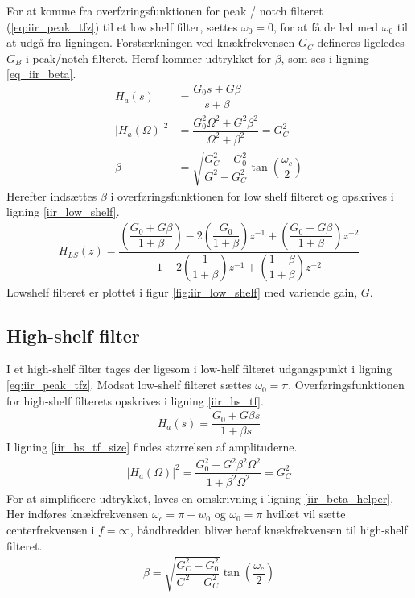 	For at komme fra overføringsfunktionen for peak / notch filteret (\ref{eq:iir_peak_tfz}) til et low shelf filter, sættes $\omega_0 = 0$, for at få de led med $\omega_0$ til at udgå fra ligningen. 
	Forstærkningen ved knækfrekvensen $G_C$ defineres ligeledes $G_B$ i peak/notch filteret.
    Heraf kommer udtrykket for $\beta$, som ses i ligning \ref{eq_iir_beta}.
    \begin{align}
        H_a (s) &= \dfrac{G_0 s + G \beta}{s + \beta} \nonumber \\
        |H_a (\Omega)|^2 &= \dfrac{G_0^2 \Omega^2 + G^2 \beta^2}{\Omega^2 + \beta^2} = G_C^2 \nonumber \\
        \beta &= \sqrt{\dfrac{G_C^2 - G_0^2}{G^2 - G_C^2}} \tan \left( \dfrac{\omega_c}{2} \right) \label{eq_iir_beta}
    \end{align}
	Herefter indsættes $\beta$ i overføringsfunktionen for low shelf filteret og opskrives i ligning \ref{iir_low_shelf}.
     \begin{align}
      H_{LS}(z) =  \dfrac{\left(\dfrac{G_0 + G \beta}{1 + \beta} \right)- 2 \left(\dfrac{G_0 }{1 +\beta} \right)z^{-1} + \left(\dfrac{ G_0 - G \beta}{1 + \beta }\right) z^{-2}}{1 - 2 \left(\dfrac{1}{1 + \beta}\right)z^{-1} + \left( \dfrac{1 - \beta}{1 + \beta} \right) z^{-2}} \label{iir_low_shelf}
     \end{align}
	Lowshelf filteret er plottet i figur \ref{fig:iir_low_shelf} med variende gain, $G$.
   
   
     \subsection{High-shelf filter}
	I et high-shelf filter tages der ligesom i low-helf filteret udgangspunkt i ligning \ref{eq:iir_peak_tfz}. Modsat low-shelf filteret sættes $\omega_0 = \pi$.
	Overføringsfunktionen for high-shelf filterets opskrives i ligning \ref{iir_hs_tf}.
     \begin{align}
        H_a (s) = \dfrac{G_0 + G \beta s}{1 + \beta s} \label{iir_hs_tf}
     \end{align}
	I ligning \ref{iir_hs_tf_size} findes størrelsen af amplituderne.
     \begin{align}
         |H_a(\Omega)|^2 = \dfrac{G_0^2 + G^2 \beta^2 \Omega^2}{1 + \beta^2 \Omega^2} = G_C^2 \label{iir_hs_tf_size}
     \end{align}
     For at simplificere udtrykket, laves en omskrivning i ligning \ref{iir_beta_helper}. Her indføres knækfrekvensen $\omega_c = \pi - w_0$ og $\omega_0 = \pi$ hvilket vil sætte centerfrekvensen i $f = \infty$, båndbredden bliver heraf knækfrekvensen til high-shelf filteret.
    \begin{align}
        \beta = \sqrt{\dfrac{G_C^2 - G_0^2}{G^2 - G_C^2}} \tan \left( \dfrac{\omega_c}{2} \right) \label{iir_beta_helper}
    \end{align}

